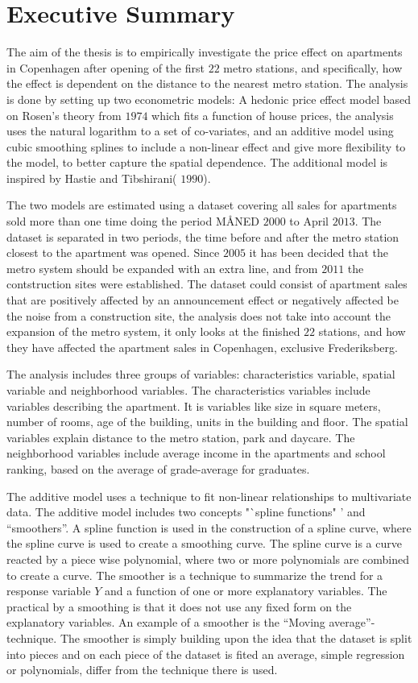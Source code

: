 \section{Executive Summary}
The aim of the thesis is to empirically investigate the price effect on 
apartments in Copenhagen after opening of the first $22$ metro stations, and 
specifically, how the effect is dependent on the distance to the nearest 
metro station. The analysis is done by setting up two econometric models:  A 
hedonic price effect model based on Rosen's theory from $1974$ which fits a 
function of house prices, the analysis uses the natural logarithm to a 
set of co-variates,  and an additive model using cubic smoothing splines to 
include a non-linear effect and give more flexibility to the model, to better 
capture the spatial dependence. The additional model is inspired by Hastie and 
Tibshirani( $1990$). 

The two models are estimated using a dataset covering all sales for 
apartments sold more than one time doing the period MÅNED $2000$ to April $2013$. The 
dataset is separated in two periods, the time before and after the metro 
station closest to the apartment was opened. Since $2005$ it has been decided 
that the metro system should be expanded with an extra line, and from $2011$ 
the contstruction sites were established. The dataset could consist of apartment 
sales that are positively affected by an announcement effect or negatively affected 
be the noise from a construction site, the analysis does not take into account 
the expansion of the metro system, it only looks at  the finished $22$ 
stations, and how they have affected the apartment sales in Copenhagen, 
exclusive Frederiksberg. %

The analysis includes three groups of variables: characteristics variable, 
spatial variable and neighborhood variables. The characteristics variables 
include variables describing the apartment. It is variables like size in square 
meters, number of rooms, age of the building, units in the building and 
floor. The spatial variables explain distance to the metro station, park and 
daycare. The neighborhood variables include average income in the apartments 
and school ranking, based on the average of grade-average for graduates. 

The additive model uses a technique to fit non-linear relationships to 
multivariate data. The additive model includes two concepts "`spline functions"
' and "`smoothers"'.  A spline function is used in the construction of a 
spline curve, where the spline curve is used to create a smoothing curve.  
The spline curve is a curve reacted by a piece wise polynomial, where two or 
more polynomials are combined to create a curve. The smoother is a technique to
summarize the trend for a response variable $Y$ and a function of one or more 
explanatory variables. The practical by a smoothing is that it does not use 
any fixed form on the explanatory variables.  An example of a smoother is the 
"`Moving average"'-technique. The smoother is simply building upon the idea 
that the dataset is split into pieces and on each piece of the dataset is 
fited an average, simple regression or polynomials, differ from the technique
there is used.

